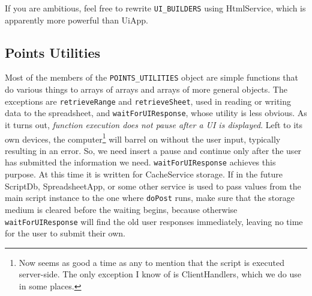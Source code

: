 \documentclass{article}
\begin{document}
If you are ambitious, feel free to rewrite \texttt{UI\_BUILDERS} using HtmlService, which is apparently more powerful than UiApp.

\subsection{Points Utilities}
Most of the members of the \texttt{POINTS\_UTILITIES} object are simple functions that do various things to arrays of arrays and arrays of more general objects.
The exceptions are \texttt{retrieveRange} and \texttt{retrieveSheet}, used in reading or writing data to the spreadsheet, and \texttt{waitForUIResponse}, whose utility is less obvious.
As it turns out, \emph{function execution does not pause after a UI is displayed}.
Left to its own devices, the computer\footnote{%
Now seems as good a time as any to mention that the script is executed server-side.
The only exception I know of is ClientHandlers, which we do use in some places.%
}
will barrel on without the user input, typically resulting in an error.
So, we need insert a pause and continue only after the user has submitted the information we need.
\texttt{waitForUIResponse} achieves this purpose.
At this time it is written for CacheService storage.
If in the future ScriptDb, SpreadsheetApp, or some other service is used to pass values from the main script instance to the one where \texttt{doPost} runs, make sure that the storage medium is cleared before the waiting begins, because otherwise \texttt{waitForUIResponse} will find the old user responses immediately, leaving no time for the user to submit their own.
\end{document}
